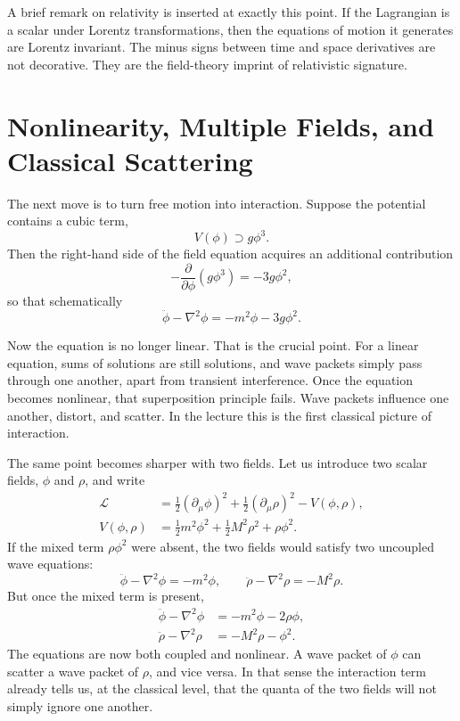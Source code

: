 A brief remark on relativity is inserted at exactly this point. If the Lagrangian is a scalar under Lorentz transformations, then the equations of motion it generates are Lorentz invariant. The minus signs between time and space derivatives are not decorative. They are the field-theory imprint of relativistic signature.

\section{Nonlinearity, Multiple Fields, and Classical Scattering}

The next move is to turn free motion into interaction. Suppose the potential contains a cubic term,
\begin{equation}
V(\phi)\supset g\phi^3.
\end{equation}
Then the right-hand side of the field equation acquires an additional contribution
\begin{equation}
-\frac{\partial}{\partial\phi}(g\phi^3)=-3g\phi^2,
\end{equation}
so that schematically
\begin{equation}
\ddot\phi-\nabla^2\phi=-m^2\phi-3g\phi^2.
\end{equation}

Now the equation is no longer linear. That is the crucial point. For a linear equation, sums of solutions are still solutions, and wave packets simply pass through one another, apart from transient interference. Once the equation becomes nonlinear, that superposition principle fails. Wave packets influence one another, distort, and scatter. In the lecture this is the first classical picture of interaction.

The same point becomes sharper with two fields. Let us introduce two scalar fields, \(\phi\) and \(\rho\), and write
\begin{align}
\mathcal L
&=
\frac12 (\partial_\mu\phi)^2
+
\frac12 (\partial_\mu\rho)^2
-
V(\phi,\rho),
\\
V(\phi,\rho)
&=
\frac12 m^2\phi^2+\frac12 M^2\rho^2+\rho\phi^2.
\end{align}
If the mixed term \(\rho\phi^2\) were absent, the two fields would satisfy two uncoupled wave equations:
\begin{equation}
\ddot\phi-\nabla^2\phi=-m^2\phi,
\qquad
\ddot\rho-\nabla^2\rho=-M^2\rho.
\end{equation}
But once the mixed term is present,
\begin{align}
\ddot\phi-\nabla^2\phi &= -m^2\phi-2\rho\phi,
\\
\ddot\rho-\nabla^2\rho &= -M^2\rho-\phi^2.
\end{align}
The equations are now both coupled and nonlinear. A wave packet of \(\phi\) can scatter a wave packet of \(\rho\), and vice versa. In that sense the interaction term already tells us, at the classical level, that the quanta of the two fields will not simply ignore one another.

